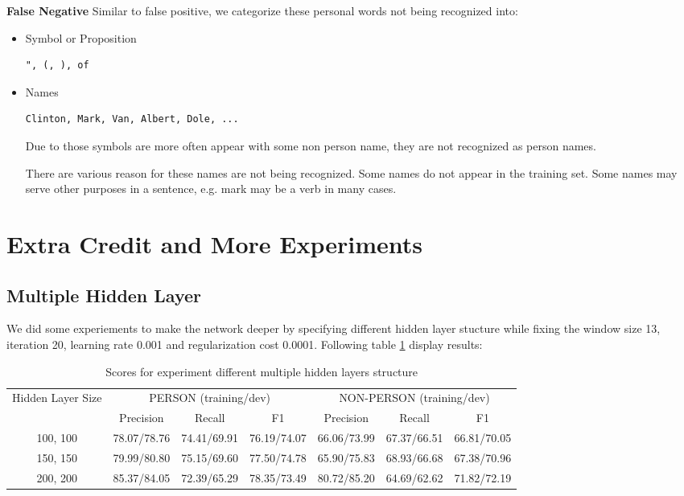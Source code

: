 \documentclass[letterpaper]{article}
\begin{document}
\textbf{False Negative} Similar to false positive, we categorize these personal words not being recognized into:
\begin{itemize}
\item Symbol or Proposition
\begin{verbatim}
", (, ), of
\end{verbatim}
\item Names
\begin{verbatim}
Clinton, Mark, Van, Albert, Dole, ...
\end{verbatim}

Due to those symbols are more often appear with some non person name, they are not recognized as person names.

There are various reason for these names are not being recognized. Some names do not appear in the training set. Some names may serve other purposes in a sentence, e.g. mark may be a verb in many cases.
\end{itemize}


\section{Extra Credit and More Experiments}


\subsection{Multiple Hidden Layer}
We did some experiements to make the network deeper by specifying different hidden layer stucture while fixing the window size 13, iteration 20, learning rate 0.001 and regularization cost 0.0001. Following table \ref{tab:multihidden} display results:
\begin{table}[h]
\begin{center}
\begin{tabular}{|c|c|c|c|c|c|c|}
\hline
\multirow{2}{*}{Hidden Layer Size} & 
\multicolumn{3}{c|}{PERSON (training/dev)} & \multicolumn{3}{c|}{NON-PERSON (training/dev)} \\
\hhline{~------}
& Precision & Recall & F1 & Precision & Recall & F1 \\
\hline
100, 100 & 78.07/78.76 & 74.41/69.91 & 76.19/74.07 
& 66.06/73.99 & 67.37/66.51 & 66.81/70.05 \\
\hline
150, 150 & 79.99/80.80 & 75.15/69.60 & 77.50/74.78 
& 65.90/75.83 & 68.93/66.68 & 67.38/70.96 \\
\hline
200, 200 & 85.37/84.05 & 72.39/65.29 & 78.35/73.49
& 80.72/85.20 & 64.69/62.62 & 71.82/72.19 \\
\hline
\end{tabular}
\caption{Scores for experiment different multiple hidden layers structure}
\label{tab:multihidden}
\end{center}
\end{table}
\end{document}
